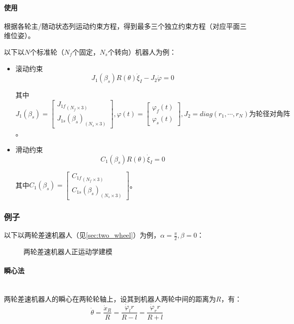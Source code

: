 \documentclass[
12pt, %
a4paper, 
oneside, %
headinclude,footinclude, %
]{scrartcl}
\begin{document}
\paragraph{使用}
根据各轮主/随动状态列运动约束方程，得到最多三个独立约束方程（对应平面三维位姿）。

以下以$ N $个标准轮（$ N_f $个固定，$ N_s $个转向）机器人为例：
\begin{itemize}
\item 滚动约束
$$ J_1(\beta_s) R(\theta) \dot{\xi}_I - J_2 \dot{\varphi} = 0 $$

其中$ J_1(\beta_s) =  \begin{bmatrix} {J_{1f}}_{(N_f \times 3)} \\ {J_{1s}(\beta_s)}_{(N_s \times 3)} \end{bmatrix}, \varphi(t) = \begin{bmatrix} \varphi_f(t) \\ \varphi_s(t) \end{bmatrix}, J_2 = diag(r_1, \cdots, r_N)\text{为轮径对角阵} $。
\item 滑动约束
$$ C_1(\beta_s) R(\theta) \dot{\xi}_I = 0 $$

其中$ C_1(\beta_s) = \begin{bmatrix} {C_{1f}}_{(N_f \times 3)} \\ {C_{1s}(\beta_s)}_{(N_s \times 3)} \end{bmatrix} $。
\end{itemize}
\subsubsection[例子]{例子}\label{sec:example1}
以下以两轮差速机器人（见\ref{sec:two_wheel}）为例，$ \alpha = \frac{\pi}{2}, \beta = 0 $：
\begin{figure}[H]
\centering
{} \quad
{}
\caption{两轮差速机器人正运动学建模}
\end{figure}
\paragraph{瞬心法}~\\

两轮差速机器人的瞬心在两轮轮轴上，设其到机器人两轮中间的距离为$ R $，有：
$$ \dot{\theta} = \frac{\dot{x}_R}{R} = \frac{\dot{\varphi}_l r}{R-l} = \frac{\dot{\varphi}_r r}{R+l} $$
\end{document}
